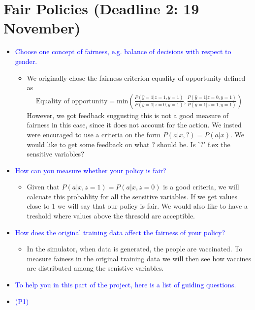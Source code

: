 
\section*{Fair Policies (Deadline 2: 19 November)}
\begin{itemize}
    \item \textcolor{blue}{Choose one concept of fairness, e.g. balance of decisions with respect to gender.}
    \begin{itemize}
        \item We originally chose the fairness criterion equality of opportunity defined as 
        \begin{align*}
            \text{Equality of opportunity} = \text{min} \left( \frac{P(\hat{y} = 1 | z = 1, y = 1)}{P(\hat{y} = 1 | z=0, y=1)} , \frac{P(\hat{y} = 1 | z = 0, y = 1)}{P(\hat{y} = 1 | z=1, y=1)}\right)
        \end{align*}
        However, we got feedback suggusting this is not a good measure of fairness in this case, since it does not account for the action. 
        We insted were encuraged to use a criteria on the form $P(a|x,?) = P(a|x)$. 
        We would like to get some feedback on what $?$ should be. Is '?' f.ex the sensitive variables?
    \end{itemize}
    \item \textcolor{blue}{How can you measure whether your policy is fair?}
    \begin{itemize}
        \item Given that $P(a|x,z=1) = P(a|x,z=0)$ is a good criteria, we will calcuate this probablity for all the sensitive variables. If we get values close to 1 we will say that our policy is fair. We would also like to have a treshold where values above the thresold are acceptible.
    \end{itemize}
    \item \textcolor{blue}{How does the original training data affect the fairness of your policy?}
    \begin{itemize}
        \item In the simulator, when data is generated, the people are vaccinated. To measure fainess in the original training data we will then see how vaccines are distributed among the senistive variables. 
    \end{itemize}
    \item \textcolor{blue}{To help you in this part of the project, here is a list of guiding questions.}
    \item \textcolor{blue}{(P1)}

\end{itemize}
